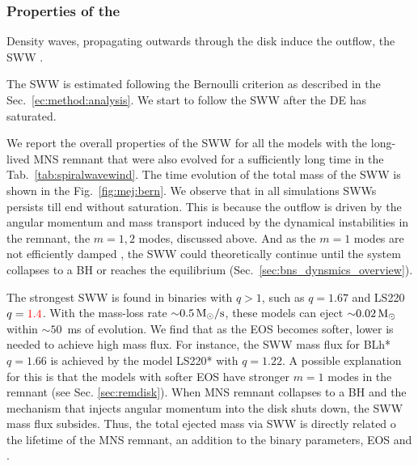 


\subsubsection{Properties of the \swind{}}


Density waves, propagating outwards through the disk induce the outflow, the \ac{SWW} 
\citep{Nedora:2019jhl}.


The \ac{SWW} is estimated following the Bernoulli criterion as described in 
the Sec.~\ref{ec:method:analysis}. 
We start to follow the \ac{SWW} after the \ac{DE} has saturated. 

We report the overall properties of the \ac{SWW} for all the models with the 
long-lived \ac{MNS} remnant that were also evolved for a sufficiently long time 
in the Tab.~\ref{tab:spiralwavewind}. 
The time evolution of the total mass of the \ac{SWW} is shown in the Fig.~\ref{fig:mej:bern}.
We observe that in all simulations \acp{SWW} persists till end without saturation.
This is because the outflow is driven by the angular momentum and mass transport 
induced by the dynamical instabilities in the remnant, the $m=1,2$ modes, discussed 
above. And as the $m=1$ modes are not efficiently damped \citep{Paschalidis:2015mla,Radice:2016gym,Lehner:2016wjg,East:2016zvv},
the \ac{SWW} could theoretically continue until the system collapses to a \ac{BH} 
or reaches the equilibrium (Sec.~\ref{sec:bns_dynsmics_overview}).

The strongest \ac{SWW} is found in binaries with $q>1$, such as 
$q=1.67$ and LS220 $q=\textcolor{red}{1.4}$. 
With the mass-loss rate ${\sim}0.5\, {\text{M}_{\odot}}/{\text{s}}$, these models can eject 
${\sim}0.02\,{\text{M}_{\odot}}$ within ${\sim}50$~ms of \pmerg{} evolution.
We find that as the \ac{EOS} becomes softer, lower \mr{} is needed to achieve high 
mass flux. For instance, the \ac{SWW} mass flux for BLh* $q=1.66$ is achieved by the 
model LS220* with $q=1.22$. 
A possible explanation for this is that the models with softer \ac{EOS} have stronger 
$m=1$ modes in the remnant (see Sec. \ref{sec:remdisk}).
When \ac{MNS} remnant collapses to a \ac{BH} and the mechanism that injects angular 
momentum into the disk shuts down, the \ac{SWW} mass flux subsides. 
Thus, the total ejected mass via \ac{SWW} is directly related  o the lifetime of the 
\ac{MNS} remnant, an addition to the binary parameters, \ac{EOS} and \mr{}.

